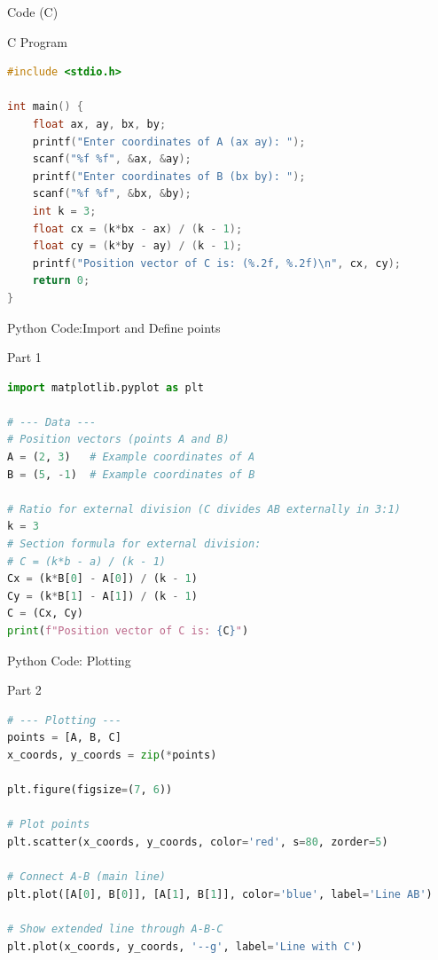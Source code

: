 \documentclass{beamer}
\begin{document}
\begin{frame}[fragile]{ Code (C)}
\begin{block}{C Program}
\begin{lstlisting}[language=C, basicstyle=\ttfamily\small, keywordstyle=\color{blue}, frame=single]
#include <stdio.h>

int main() {
    float ax, ay, bx, by;
    printf("Enter coordinates of A (ax ay): ");
    scanf("%f %f", &ax, &ay);
    printf("Enter coordinates of B (bx by): ");
    scanf("%f %f", &bx, &by);
    int k = 3;
    float cx = (k*bx - ax) / (k - 1);
    float cy = (k*by - ay) / (k - 1);
    printf("Position vector of C is: (%.2f, %.2f)\n", cx, cy);
    return 0;
}
\end{lstlisting}
\end{block}
\end{frame}


\begin{frame}[fragile]{Python Code:Import and Define points}
\begin{block}{Part 1}
\begin{lstlisting}[language=Python, basicstyle=\ttfamily\small, keywordstyle=\color{blue}, frame=single]
import matplotlib.pyplot as plt

# --- Data ---
# Position vectors (points A and B)
A = (2, 3)   # Example coordinates of A
B = (5, -1)  # Example coordinates of B

# Ratio for external division (C divides AB externally in 3:1)
k = 3   
# Section formula for external division:
# C = (k*b - a) / (k - 1)
Cx = (k*B[0] - A[0]) / (k - 1)
Cy = (k*B[1] - A[1]) / (k - 1)
C = (Cx, Cy)
print(f"Position vector of C is: {C}")

\end{lstlisting}
\end{block}
\end{frame}

\begin{frame}[fragile]{Python Code: Plotting}
\begin{block}{Part 2}
\begin{lstlisting}[language=Python, basicstyle=\ttfamily\small, keywordstyle=\color{blue}, frame=single]
# --- Plotting ---
points = [A, B, C]
x_coords, y_coords = zip(*points)

plt.figure(figsize=(7, 6))

# Plot points
plt.scatter(x_coords, y_coords, color='red', s=80, zorder=5)

# Connect A-B (main line)
plt.plot([A[0], B[0]], [A[1], B[1]], color='blue', label='Line AB')

# Show extended line through A-B-C
plt.plot(x_coords, y_coords, '--g', label='Line with C')
\end{lstlisting}
\end{block}
\end{frame}
\end{document}
